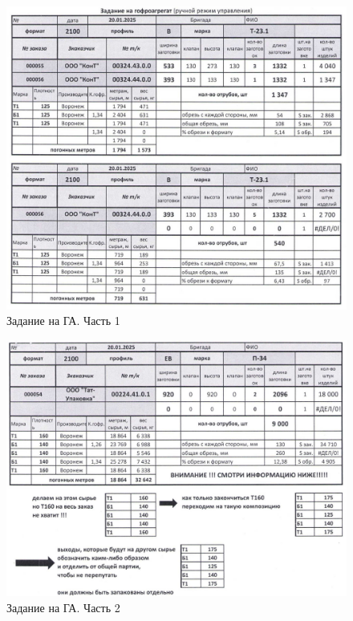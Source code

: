 \begin{figure}
\begin{center}
\includegraphics[height=0.94\textheight, width=\textwidth, keepaspectratio]{Pics/f8b.jpg}
\end{center}
\caption{Задание на ГА. Часть 1}
\label{pic:f8b}
\end{figure}

\begin{figure}
\begin{center}
\includegraphics[height=0.94\textheight, width=\textwidth, keepaspectratio]{Pics/f8a.jpg}
\end{center}
\caption{Задание на ГА. Часть 2}
\label{pic:f8a}
\end{figure}

